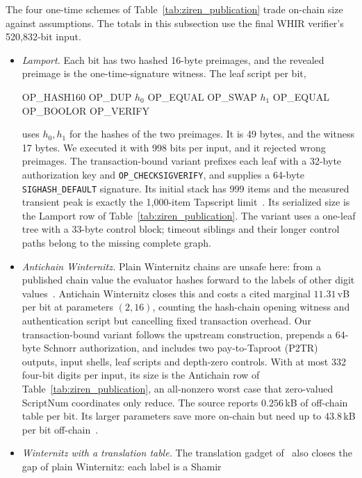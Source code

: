 \documentclass[11pt]{article}
\begin{document}
The four one-time schemes of Table~\ref{tab:ziren_publication} trade
on-chain size against assumptions. The totals in this subsection use the
final WHIR verifier's 520{,}832-bit input.
\begin{itemize}
  \item \emph{Lamport.} Each bit has two hashed 16-byte preimages, and the
    revealed preimage is the one-time-signature witness. The leaf script
    per bit,
    \begin{center}\ttfamily\small OP\_HASH160 OP\_DUP $h_0$ OP\_EQUAL OP\_SWAP $h_1$ OP\_EQUAL OP\_BOOLOR OP\_VERIFY\end{center}
    uses $h_0,h_1$ for the hashes of the two preimages. It is 49 bytes,
    and the witness 17 bytes. We executed it with 998 bits per
    input, and it rejected wrong preimages. The transaction-bound variant
    prefixes each leaf with a 32-byte authorization key and
    \texttt{OP\_CHECKSIGVERIFY}, and supplies a 64-byte
    \texttt{SIGHASH\_DEFAULT} signature. Its initial stack has 999 items and
    the measured transient peak is exactly the 1{,}000-item Tapscript
    limit~\cite{bip342}. Its serialized size is the Lamport row of
    Table~\ref{tab:ziren_publication}. The variant uses a one-leaf tree with a 33-byte
    control block; timeout siblings and their longer control paths belong to
    the missing complete graph.
  \item \emph{Antichain Winternitz.} Plain Winternitz chains are unsafe here: from
    a published chain value the evaluator hashes forward to the labels of other
    digit values~\cite{antichain26}. Antichain Winternitz closes this and costs
    a cited marginal $11.31$\,vB per bit at parameters $(2,16)$, counting the
    hash-chain opening witness and authentication script but cancelling fixed
    transaction overhead. Our transaction-bound variant follows the upstream
    construction, prepends a 64-byte Schnorr authorization, and includes two
    pay-to-Taproot (P2TR) outputs, input shells, leaf scripts and depth-zero
    controls. With at most 332 four-bit digits per input, its size is the
    Antichain row of Table~\ref{tab:ziren_publication}, an all-nonzero worst case that
    zero-valued ScriptNum coordinates only reduce. The source
    reports $0.256$\,kB of off-chain table per bit. Its
    larger parameters save more on-chain but need up to $43.8$\,kB per bit
    off-chain~\cite{antichain26}.
  \item \emph{Winternitz with a translation table.} The translation gadget
    of~\cite{wotstranslation26} also closes the gap of plain Winternitz: each label is a Shamir

\end{itemize}
\end{document}

